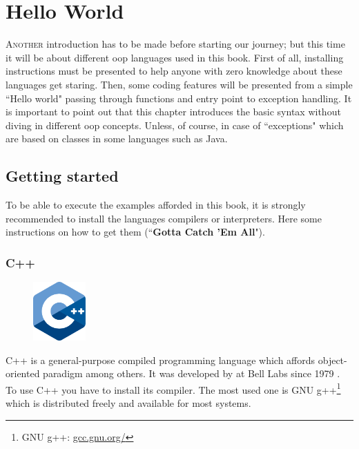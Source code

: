 \documentclass{KodeBook}
\begin{document}
\fi

\chapter{Hello World}

\begin{introduction}
	\lettrine{A}{nother} introduction has to be made before starting our journey; but this time it will be about different \ac{oop} languages used in this book. 
	First of all, installing instructions must be presented to help anyone with zero knowledge about these languages get staring. 
	Then, some coding features will be presented from a simple ``Hello world" passing through functions and entry point to exception handling. 
	It is important to point out that this chapter introduces the basic syntax without diving in different \ac{oop} concepts.
	Unless, of course, in case of ``exceptions" which are based on classes in some languages such as Java.
\end{introduction}


\section{Getting started}

To be able to execute the examples afforded in this book, it is strongly recommended to install the languages compilers or interpreters.
Here some instructions on how to get them (``\textbf{Gotta Catch 'Em All}").

\subsection{C++}

\begin{figure}
	\centering
	\vspace{-20pt}
	\includegraphics[width=2cm]{../img/C++.pdf}
	\vspace{-30pt}
\end{figure}

C++ is a general-purpose compiled programming language which affords object-oriented paradigm among others. 
It was developed by  at Bell Labs since 1979 \citep{1993-stroustrup}.
To use C++ you have to install its compiler. 
The most used one is GNU g++\footnote{GNU g++: \url{gcc.gnu.org/}} which is distributed freely and available for most systems.
\end{document}

